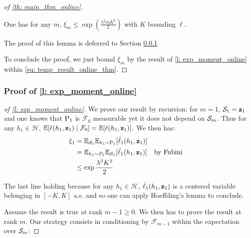 \begin{noaddcontents}
\begin{proof}[of \cref{th: main_thm_online}]
\begin{lemma}
\label{l: exp_moment_online}
One has for any $m$, $\xi_m \leq \exp\left(\frac{\lambda^2m K^2}{2}\right)$ with $K$ bounding $\ell$.
\end{lemma}

The proof of this lemma is deferred to Section \ref{sec: proof_exp_moment_online}


To conclude the proof, we just bound $\xi_m$ by the result of \cref{l: exp_moment_online} within \cref{eq: temp_result_online_thm}.
\end{proof}

\subsubsection{Proof of \cref{l: exp_moment_online}}
\label{sec: proof_exp_moment_online}


\begin{proof}[of \cref{l: exp_moment_online}]
  We prove our result by recursion: for $m=1$, $\S_1={\z_1}$ and one knows that $\P_1$ is $\mathcal{F}_0$ measurable yet it does not depend on $\Sm$. Thus for any $h_1\in\mathcal{H}$, $\mathbb{E}[\ell(h_1,\z_1)\mid \mathcal{F}_{0}]= \mathbb{E}[\ell(h_1,\z_1)]$. We then has:
  \begin{align*}
    \xi_1 &= \mathbb{E}_{\S_1}\mathbb{E}_{h_1\sim \P_1} [\Tilde{\ell}_1(h_1,\z_1)]\\
    &= \mathbb{E}_{h_1\sim P_1} \mathbb{E}_{\S_1} [\Tilde{\ell}_1(h_1,\z_1)] & \text{by Fubini} \\
    & \leq \exp{\frac{\lambda^2K^2}{2}}
  \end{align*}

The last line  holding because for any $h_1\in\mathcal{H}$, $\Tilde{\ell}_1(h_1,\z_1)$ is a centered variable belonging in $[-K,K]$ a.s. and so one can apply Hoeffding's lemma to conclude.


\noindent Assume the result is true at rank $m-1\geq 0$. We then has to prove the result at rank $m$. Our strategy consists in conditioning by $\mathcal{F}_{m-1}$ within the expectation over $\Sm$:


\end{proof}
\end{noaddcontents}
